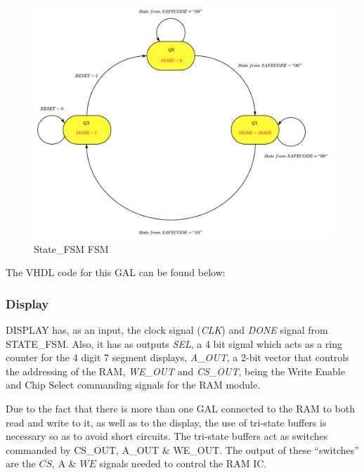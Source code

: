\begin{figure}[H]
    \centering
    \includegraphics[scale = 0.49]{Graphics/STATE_FSM + DISPLAY/STATE_FSM.pdf}
    \caption{State\_FSM FSM}
    \label{fig:STATE_FSM_FSM}
\end{figure}

\vspace{0.6cm}

The VHDL code for this GAL can be found below: \bigskip



\clearpage

\subsubsection{Display}
\label{sec:DISPLAY}

DISPLAY has, as an input, the clock signal (\textit{CLK}) and \textit{DONE} signal from STATE\_FSM. Also, it has as outputs \textit{SEL}, a 4 bit signal which acts as a ring counter for the 4 digit 7 segment displays, \textit{A\_OUT}, a 2-bit vector that controls the addressing of the RAM,  \textit{WE\_OUT} and \textit{CS\_OUT}, being the Write Enable and Chip Select commanding signals for the RAM module.\medskip

Due to the fact that there is more than one GAL connected to the RAM to both read and write to it, as well as to the display, the use of tri-state buffers is necessary so as to avoid short circuits. The tri-state buffers act as switches commanded by CS\_OUT,  A\_OUT \& WE\_OUT. The output of these “switches” are the $\overline{CS}$, A \& $\overline{WE}$ signals needed to control the RAM IC.\medskip


